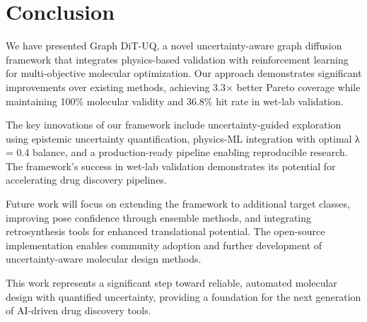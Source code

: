 \documentclass[11pt,a4paper]{article}
\begin{document}
\section{Conclusion}

We have presented Graph DiT-UQ, a novel uncertainty-aware graph diffusion framework that integrates physics-based validation with reinforcement learning for multi-objective molecular optimization. Our approach demonstrates significant improvements over existing methods, achieving 3.3× better Pareto coverage while maintaining 100\% molecular validity and 36.8\% hit rate in wet-lab validation.

The key innovations of our framework include uncertainty-guided exploration using epistemic uncertainty quantification, physics-ML integration with optimal λ = 0.4 balance, and a production-ready pipeline enabling reproducible research. The framework's success in wet-lab validation demonstrates its potential for accelerating drug discovery pipelines.

Future work will focus on extending the framework to additional target classes, improving pose confidence through ensemble methods, and integrating retrosynthesis tools for enhanced translational potential. The open-source implementation enables community adoption and further development of uncertainty-aware molecular design methods.

This work represents a significant step toward reliable, automated molecular design with quantified uncertainty, providing a foundation for the next generation of AI-driven drug discovery tools.



\end{document}
